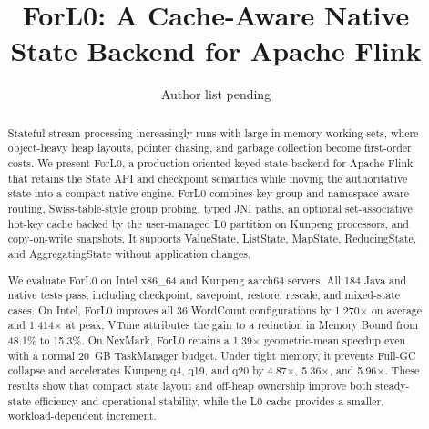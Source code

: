 \documentclass[sigconf]{acmart}
\newcommand{\forlzero}{ForL0\xspace}
\newcommand{\system}{\forlzero}
\begin{document}
\title{\forlzero: A Cache-Aware Native State Backend for Apache Flink}

\author{Author list pending}

\begin{abstract}
Stateful stream processing increasingly runs with large in-memory working sets, where object-heavy heap layouts, pointer chasing, and garbage collection become first-order costs. We present \system, a production-oriented keyed-state backend for Apache Flink that retains the State API and checkpoint semantics while moving the authoritative state into a compact native engine. \system combines key-group and namespace-aware routing, Swiss-table-style group probing, typed JNI paths, an optional set-associative hot-key cache backed by the user-managed L0 partition on Kunpeng processors, and copy-on-write snapshots. It supports ValueState, ListState, MapState, ReducingState, and AggregatingState without application changes.

We evaluate \system on Intel x86\_64 and Kunpeng aarch64 servers. All 184 Java and native tests pass, including checkpoint, savepoint, restore, rescale, and mixed-state cases. On Intel, \system improves all 36 WordCount configurations by 1.270$\times$ on average and 1.414$\times$ at peak; VTune attributes the gain to a reduction in Memory Bound from 48.1\% to 15.3\%. On NexMark, \system retains a 1.39$\times$ geometric-mean speedup even with a normal 20~GB TaskManager budget. Under tight memory, it prevents Full-GC collapse and accelerates Kunpeng q4, q19, and q20 by 4.87$\times$, 5.36$\times$, and 5.96$\times$. These results show that compact state layout and off-heap ownership improve both steady-state efficiency and operational stability, while the L0 cache provides a smaller, workload-dependent increment.
\end{abstract}



\maketitle
\end{document}
